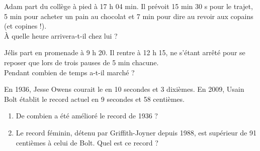 \begin{colonne*exercice}
\begin{exercice}
   Adam part du collège à pied à 17 h 04 min. Il prévoit 15 min 30 s pour le trajet, 5 min pour acheter un pain au chocolat et 7 min pour dire au revoir aux copains (et copines !). \\
   À quelle heure arrivera-t-il chez lui ?
\end{exercice}

\begin{exercice}
   Jélis part en promenade à 9 h 20. Il rentre à 12 h 15, ne s'étant arrêté pour se reposer que lors de trois pauses de 5 min chacune. \\
   Pendant combien de temps a-t-il marché ?
\end{exercice}

\begin{exercice}
   En 1936, Jesse Owens courait le  en 10 secondes et 3 dixièmes. En 2009, Usain Bolt établit le record actuel en 9 secondes et 58 centièmes.
   \begin{enumerate}
      \item De combien a été amélioré le record de 1936 ?
      \item Le record féminin, détenu par Griffith-Joyner depuis 1988, est supérieur de 91 centièmes à celui de Bolt. Quel est ce record ?
   \end{enumerate}
\end{exercice}




\end{colonne*exercice}
